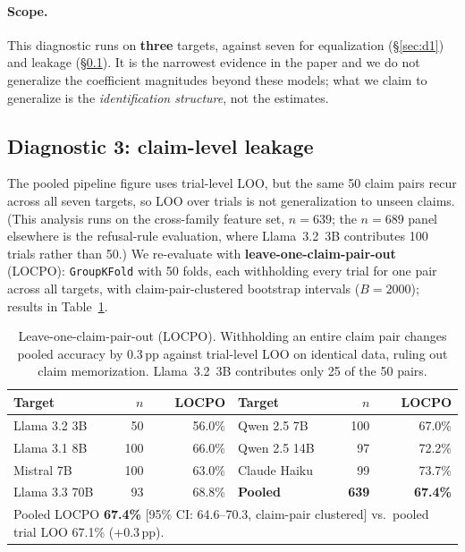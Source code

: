 \paragraph{Scope.} This diagnostic runs on \textbf{three} targets, against seven for equalization (§\ref{sec:d1}) and leakage (§\ref{sec:d3}). It is the narrowest evidence in the paper and we do not generalize the coefficient magnitudes beyond these models; what we claim to generalize is the \emph{identification structure}, not the estimates.

\subsection{Diagnostic 3: claim-level leakage}
\label{sec:d3}

The pooled pipeline figure uses trial-level LOO, but the same 50 claim pairs recur across all seven targets, so LOO over trials is not generalization to unseen claims. (This analysis runs on the cross-family feature set, $n\!=\!639$; the $n\!=\!689$ panel elsewhere is the refusal-rule evaluation, where Llama~3.2~3B contributes 100 trials rather than 50.) We re-evaluate with \textbf{leave-one-claim-pair-out} (LOCPO): \texttt{GroupKFold} with 50 folds, each withholding every trial for one pair across all targets, with claim-pair-clustered bootstrap intervals ($B\!=\!2000$); results in Table~\ref{tab:locpo}.

\begin{table}[t]
\centering
\small
\caption{Leave-one-claim-pair-out (LOCPO). Withholding an entire claim pair changes pooled accuracy by 0.3\,pp against trial-level LOO on identical data, ruling out claim memorization. Llama~3.2~3B contributes only 25 of the 50 pairs.}
\label{tab:locpo}
\begin{tabular}{lrr@{\hskip 2em}lrr}
\toprule
\textbf{Target} & $n$ & \textbf{LOCPO} & \textbf{Target} & $n$ & \textbf{LOCPO} \\
\midrule
Llama 3.2 3B  & \phantom{0}50 & 56.0\% & Qwen 2.5 7B   & 100 & 67.0\% \\
Llama 3.1 8B  & 100 & 66.0\% & Qwen 2.5 14B  & \phantom{0}97 & 72.2\% \\
Mistral 7B    & 100 & 63.0\% & Claude Haiku  & \phantom{0}99 & 73.7\% \\
Llama 3.3 70B & \phantom{0}93 & 68.8\% & \textbf{Pooled} & \textbf{639} & \textbf{67.4\%} \\
\midrule
\multicolumn{6}{l}{Pooled LOCPO \textbf{67.4\%} [95\% CI: 64.6--70.3, claim-pair clustered] vs.\ pooled trial LOO 67.1\% ($+0.3$\,pp).} \\
\bottomrule
\end{tabular}
\end{table}

